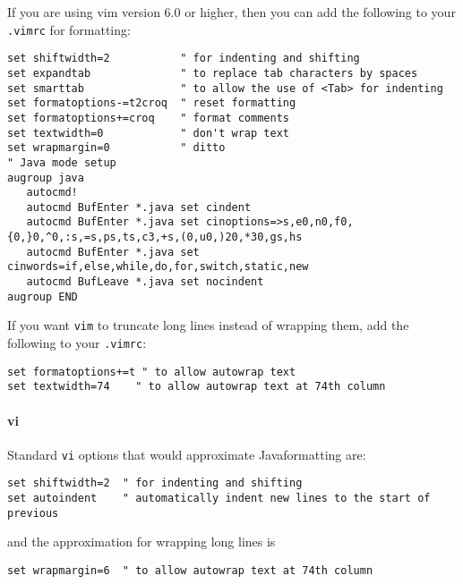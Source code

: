 If you are using vim version 6.0 or higher, then you can add the
following to your {\tt .vimrc} for formatting:
\begin{verbatim}
set shiftwidth=2           " for indenting and shifting
set expandtab              " to replace tab characters by spaces
set smarttab               " to allow the use of <Tab> for indenting
set formatoptions-=t2croq  " reset formatting
set formatoptions+=croq    " format comments
set textwidth=0            " don't wrap text
set wrapmargin=0           " ditto
" Java mode setup
augroup java
   autocmd!
   autocmd BufEnter *.java set cindent
   autocmd BufEnter *.java set cinoptions=>s,e0,n0,f0,{0,}0,^0,:s,=s,ps,ts,c3,+s,(0,u0,)20,*30,gs,hs
   autocmd BufEnter *.java set cinwords=if,else,while,do,for,switch,static,new
   autocmd BufLeave *.java set nocindent
augroup END
\end{verbatim}
If you want {\tt vim} to truncate long lines instead of wrapping them, add
the following to your {\tt .vimrc}:
\begin{verbatim}
set formatoptions+=t " to allow autowrap text
set textwidth=74    " to allow autowrap text at 74th column
\end{verbatim}

\paragraph{vi}\label{options:vi}

Standard {\tt vi} options that would approximate Java\trademark formatting are:
\begin{verbatim}
set shiftwidth=2  " for indenting and shifting
set autoindent    " automatically indent new lines to the start of previous
\end{verbatim}
and the approximation for wrapping long lines is
\begin{verbatim}
set wrapmargin=6  " to allow autowrap text at 74th column
\end{verbatim}

\JavaTMFooter


